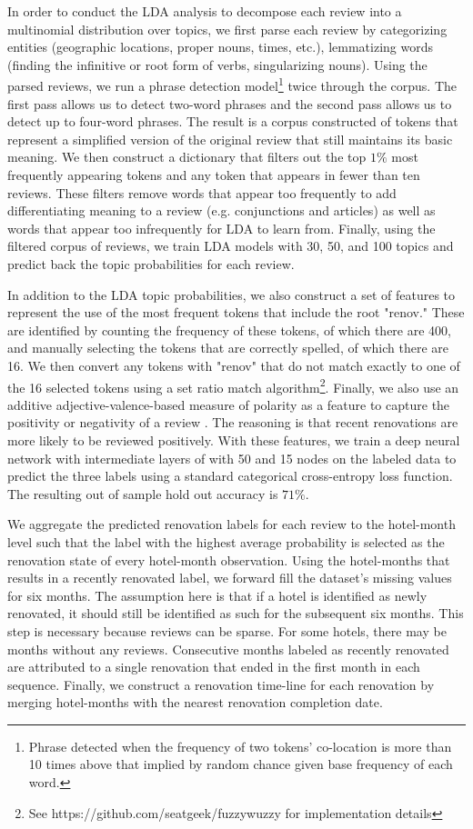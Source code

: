 \documentclass[mksc,blindrev]{informs3} %
\begin{document}
In order to conduct the LDA analysis to decompose each review into a multinomial distribution over topics, we first parse each review by categorizing entities (geographic locations, proper nouns, times, etc.), lemmatizing words (finding the infinitive or root form of verbs, singularizing nouns). Using the parsed reviews, we run a phrase detection model\footnote{Phrase detected when the frequency of two tokens' co-location is more than 10 times above that implied by random chance given base frequency of each word.} twice through the corpus. The first pass allows us to detect two-word phrases and the second pass allows us to detect up to four-word phrases. The result is a corpus constructed of tokens that represent a simplified version of the original review that still maintains its basic meaning. We then construct a dictionary that filters out the top $1\%$ most frequently appearing tokens and any token that appears in fewer than ten reviews. These filters remove words that appear too frequently to add differentiating meaning to a review (e.g. conjunctions and articles) as well as words that appear too infrequently for LDA to learn from. Finally, using the filtered corpus of reviews, we train LDA models with 30, 50, and 100 topics and predict back the topic probabilities for each review. 

In addition to the LDA topic probabilities, we also construct a set of features to represent the use of the most frequent tokens that include the root "renov." These are identified by counting the frequency of these tokens, of which there are 400, and manually selecting the tokens that are correctly spelled, of which there are 16. We then convert any tokens with "renov" that do not match exactly to one of the 16 selected tokens using a set ratio match algorithm\footnote{See https://github.com/seatgeek/fuzzywuzzy for implementation details}. Finally, we also use an additive adjective-valence-based measure of polarity as a feature to capture the positivity or negativity of a review . The reasoning is that recent renovations are more likely to be reviewed positively. With these features, we train a deep neural network with intermediate layers of with 50 and 15 nodes on the labeled data to predict the three labels using a standard categorical cross-entropy loss function. The resulting out of sample hold out accuracy is $71\%$.

We aggregate the predicted renovation labels for each review to the hotel-month level such that the label with the highest average probability is selected as the renovation state of every hotel-month observation. Using the hotel-months that results in a recently renovated label, we forward fill the dataset's missing values for six months. The assumption here is that if a hotel is identified as newly renovated, it should still be identified as such for the subsequent six months. This step is necessary because reviews can be sparse. For some hotels, there may be months without any reviews. Consecutive months labeled as recently renovated are attributed to a single renovation that ended in the first month in each sequence. Finally, we construct a renovation time-line for each renovation by merging hotel-months with the nearest renovation completion date. 
\end{document}
